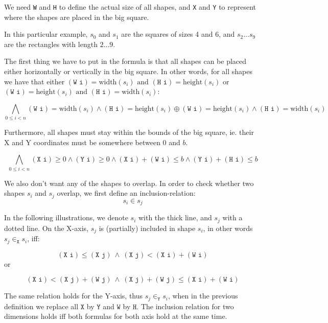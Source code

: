 \documentclass[12pt]{article}
\begin{document}
We need \texttt{W} and \texttt{H} to define the actual size of all shapes,
and \texttt{X} and \texttt{Y} to represent where the shapes are placed in the big square.

In this particular example, $s_0$ and $s_1$ are the squares of sizes 4 and 6, and $s_2 \dots s_9$ are the rectangles with length $2 \dots 9$.

The first thing we have to put in the formula is that 
all shapes can be placed either horizontally or vertically in the big square.
In other words, for all shapes we have that either 
$(\texttt{W i}) = \text{width}(s_i) \text{~and~} (\texttt{H i}) = \text{height}(s_i)$ or 
$(\texttt{W i}) = \text{height}(s_i) \text{~and~} (\texttt{H i}) = \text{width}(s_i)$:

\[ \bigwedge_{0 \le i < n}
(\texttt{W i}) = \text{width}(s_i) \wedge (\texttt{H i}) = \text{height}(s_i) \oplus
(\texttt{W i}) = \text{height}(s_i) \wedge (\texttt{H i}) = \text{width}(s_i)
\]

Furthermore, all shapes must stay within the bounds of the big square, ie. their X and Y coordinates must be somewhere between 0 and $b$.

\[ \bigwedge_{0 \le i < n}
(\texttt{X i}) \ge 0 \wedge
(\texttt{Y i}) \ge 0 \wedge
(\texttt{X i})+(\texttt{W i}) \le b \wedge
(\texttt{Y i})+(\texttt{H i}) \le b
\]

We also don't want any of the shapes to overlap.
In order to check whether two shapes $s_i$ and $s_j$ overlap, we first define an inclusion-relation:
\[ s_i \in s_j \]

\clearpage

In the following illustrations, we denote $s_i$ with the thick line, and $s_j$ with a dotted line.
On the X-axis, $s_j$ is (partially) included in shape $s_i$, 
in other words $s_j \in_{\texttt{X}} s_i$, iff:

\begin{center}
\end{center}
\[ (\texttt{X i}) \le (\texttt{X j}) ~\wedge~ (\texttt{X j}) < (\texttt{X i}) + (\texttt{W i}) \]
or
\begin{center}
\end{center}
\[ (\texttt{X i}) < (\texttt{X j}) + (\texttt{W j}) ~\wedge~ (\texttt{X j}) + (\texttt{W j}) \le (\texttt{X i}) + (\texttt{W i}) \]

The same relation holds for the Y-axis, thus $s_j \in_{\texttt{Y}} s_i$, when in the previous definition we replace all $\texttt{X}$ by $\texttt{Y}$ and $\texttt{W}$ by $\texttt{H}$.
The inclusion relation for two dimensions holds iff both formulas for both axis hold at the same time.
\end{document}

